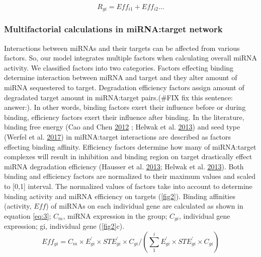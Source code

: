 \documentclass[a4,center,fleqn]{NAR}
\begin{document}
\begin{equation}
   R_{gi}= Eff_{i1} + Eff_{i2} ... \tag{2}\label{eq:2}
\end{equation}

\hypertarget{multifactorial-calculations-in-mirnatarget-network}{%
\subsubsection{Multifactorial calculations in miRNA:target
network}\label{multifactorial-calculations-in-mirnatarget-network}}

Interactions between miRNAs and their targets can be affected from
various factors. So, our model integrates multiple factors when
calculating overall miRNA activity. We classified factors into two
categories. Factors effecting binding determine interaction between
miRNA and target and they alter amount of miRNA sequestered to target.
Degradation efficiency factors assign amount of degradated target amount
in miRNA:target pairs.(\#FIX fix this sentence: answer:). In other
words, binding factors exert their influence before or during binding,
efficiency factors exert their influence after binding. In the
literature, binding free energy (Cao and Chen
\protect\hyperlink{ref-cao_predicting_2012}{2012} ; Helwak et al.
\protect\hyperlink{ref-helwak_mapping_2013}{2013}) and seed type (Werfel
et al. \protect\hyperlink{ref-werfel_preferential_2017}{2017}) in
miRNA:target interactions are described as factors effecting binding
affinity. Efficiency factors determine how many of miRNA:target
complexes will result in inhibition and binding region on target
drastically effect miRNA degradation efficiency (Hausser et al.
\protect\hyperlink{ref-hausser_analysis_2013}{2013}; Helwak et al.
\protect\hyperlink{ref-helwak_mapping_2013}{2013}). Both binding and
efficiency factors are normalized to their maximum values and scaled to
{[}0,1{]} interval. The normalized values of factors take into account
to determine binding activity and miRNA efficiency on targets
(\autoref{fig2}). Binding affinities (activity, \(Eff\)) of miRNAs on
each individual gene are calculated as shown in equation \eqref{eq:3};
\(C_m\), miRNA expression in the group; \(C_{gi}\), individual gene
expression; gi, individual gene (\autoref{fig2}c). \begin{equation}
Eff_{gi}= C_m \times E^\prime_{gi} \times STE^\prime_{gi} \times C_{gi}/(\sum_{1}^{i} E^\prime_{gi} \times STE^\prime_{gi} \times C_{gi}) \tag{3}\label{eq:3}
\end{equation}
\end{document}
